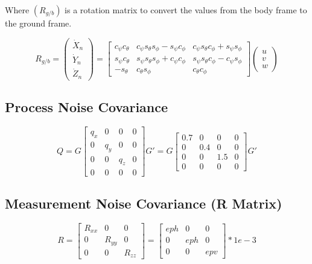 Where $(R_{g/b})$ is a rotation matrix to convert the values from the body frame to the ground frame.

\[
R_{g/b} = 
\begin{pmatrix}
\dot{X}_n \\
\dot{Y}_n \\
\dot{Z}_n
\end{pmatrix}
=
\begin{bmatrix}
c_\psi c_\theta & c_\psi s_\theta s_\phi - s_\psi c_\phi & c_\psi s_\theta c_\phi + s_\psi s_\phi \\
s_\psi c_\theta & s_\psi s_\theta s_\phi + c_\psi c_\phi & s_\psi s_\theta c_\phi - c_\psi s_\phi \\
-s_\theta       & c_\theta s_\phi                         & c_\theta c_\phi
\end{bmatrix}
\begin{pmatrix}
u \\
v \\
w
\end{pmatrix}
\]

\subsection*{Process Noise Covariance}

\[
Q = G
\begin{bmatrix}
q_x & 0 & 0 & 0 \\
0 & q_y & 0 & 0 \\
0 & 0 & q_z & 0 \\
0 & 0 & 0 & 0
\end{bmatrix}
G' = 
G
\begin{bmatrix}
0.7 & 0 & 0 & 0 \\
0 & 0.4 & 0 & 0 \\
0 & 0 & 1.5 & 0 \\
0 & 0 & 0 & 0
\end{bmatrix}
G'
\]

\subsection*{Measurement Noise Covariance (R Matrix)}

\[
R =
\begin{bmatrix}
R_{xx} & 0      & 0      \\
0      & R_{yy} & 0      \\
0      & 0      & R_{zz}
\end{bmatrix}
= 
\begin{bmatrix}
eph & 0      & 0      \\
0      & eph & 0      \\
0      & 0      & epv
\end{bmatrix} * 1e-3
\]

